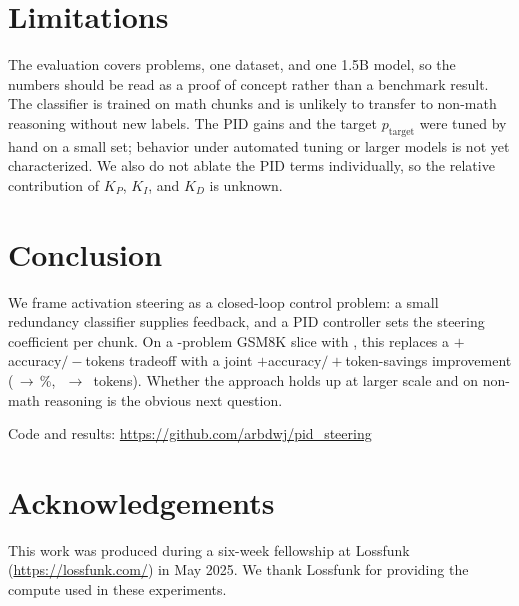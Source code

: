 \documentclass[11pt]{article}
\begin{document}
\section{Limitations}

The evaluation covers \NProblems{} problems, one dataset, and one 1.5B model, so
the numbers should be read as a proof of concept rather than a benchmark result.
The classifier is trained on math chunks and is unlikely to transfer to non-math
reasoning without new labels. The PID gains and the target $p_{\text{target}}$
were tuned by hand on a small set; behavior under automated tuning or larger
models is not yet characterized. We also do not ablate the PID terms
individually, so the relative contribution of $K_P$, $K_I$, and $K_D$ is unknown.

\section{Conclusion}

We frame activation steering as a closed-loop control problem: a small
redundancy classifier supplies feedback, and a PID controller sets the steering
coefficient per chunk. On a \NProblems{}-problem GSM8K slice with \ModelName,
this replaces a $+$accuracy$/-$tokens tradeoff with a joint
$+$accuracy$/+$token-savings improvement
(\BaselineAcc$\,\to\,$\StupidAcc\%,\ \BaselineTokens$\,\to\,$\StupidTokens{}
tokens). Whether the approach holds up at larger scale and on non-math reasoning
is the obvious next question.

\noindent Code and results: \url{https://github.com/arbdwj/pid_steering}

\section*{Acknowledgements}

This work was produced during a six-week fellowship at Lossfunk
(\url{https://lossfunk.com/}) in May 2025. We thank Lossfunk for providing the
compute used in these experiments.
\end{document}
